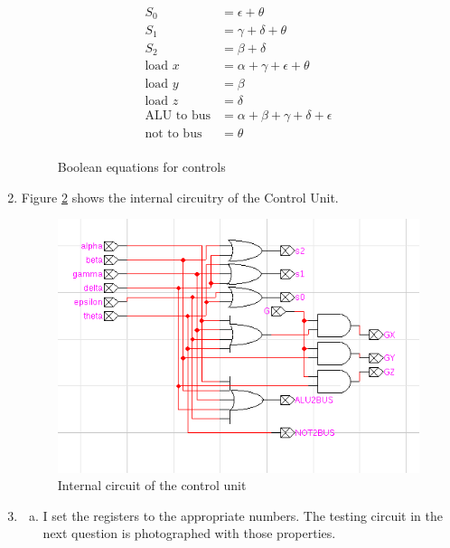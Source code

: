 \documentclass{article}
\begin{document}
\begin{enumerate}
{      \begin{figure}
        \begin{align}
          S_{0} &= \epsilon + \theta \\
          S_{1} &= \gamma + \delta + \theta \\
          S_{2} &= \beta + \delta \\
          \text{load $x$} &= \alpha + \gamma + \epsilon + \theta \\
          \text{load $y$} &= \beta \\
          \text{load $z$} &= \delta \\
          \text{ALU to bus} &= \alpha + \beta + \gamma + \delta + \epsilon \\
          \text{not to bus} &= \theta \\
        \end{align}
        \caption{\label{cpeq} Boolean equations for controls}
      \end{figure}
    }

    \item{
      Figure \ref{cucirc} shows the internal circuitry of the Control Unit.
      \begin{figure}[h]
        \centering
        \includegraphics[width=300pt]{img/cu}
        \caption{\label{cucirc} Internal circuit of the control unit}
      \end{figure}
    }

    \item{
      \begin{enumerate}[(a)]

        \item{
          I set the registers to the appropriate numbers. The testing
          circuit in the next question is photographed with those properties.
        }


\end{enumerate}}
\end{enumerate}
\end{document}
